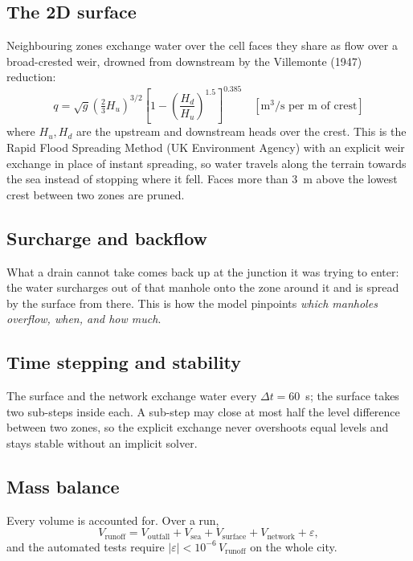 \documentclass[11pt,a4paper]{article}
\begin{document}
\subsection{The 2D surface}
Neighbouring zones exchange water over the cell faces they share as flow over a
broad-crested weir, drowned from downstream by the Villemonte (1947) reduction:
\begin{equation}
  q = \sqrt{g}\left(\tfrac{2}{3}H_u\right)^{3/2}
      \left[1-\left(\frac{H_d}{H_u}\right)^{1.5}\right]^{0.385}
  \quad[\text{m}^3/\text{s per m of crest}]
\end{equation}
where $H_u, H_d$ are the upstream and downstream heads over the crest. This is the
Rapid Flood Spreading Method (UK Environment Agency) with an explicit weir exchange in
place of instant spreading, so water travels along the terrain towards the sea instead
of stopping where it fell. Faces more than 3~m above the lowest crest between two
zones are pruned.

\subsection{Surcharge and backflow}
What a drain cannot take comes back up at the junction it was trying to enter: the
water surcharges out of that manhole onto the zone around it and is spread by the
surface from there. This is how the model pinpoints \emph{which manholes overflow,
when, and how much}.

\subsection{Time stepping and stability}
The surface and the network exchange water every $\Delta t = 60$~s; the surface takes
two sub-steps inside each. A sub-step may close at most half the level difference
between two zones, so the explicit exchange never overshoots equal levels and stays
stable without an implicit solver.

\subsection{Mass balance}
Every volume is accounted for. Over a run,
\begin{equation}
  V_{\text{runoff}} = V_{\text{outfall}} + V_{\text{sea}} + V_{\text{surface}}
                    + V_{\text{network}} + \varepsilon ,
\end{equation}
and the automated tests require $|\varepsilon| < 10^{-6}\,V_{\text{runoff}}$ on the
whole city.
\end{document}

